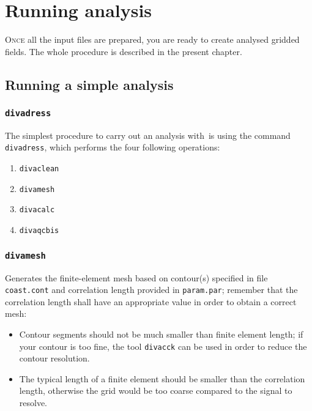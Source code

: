 \chapter{Running analysis \label{chap:running}}
\lettrine[lines=2, loversize=-0.1, lraise=0.1]{O}{nce} all the input files are prepared, you are ready to create analysed gridded fields. The whole procedure is described in the present chapter.
\minitoc

\section{Running a simple analysis}


\subsection{\texttt{divadress}}

The simplest procedure to carry out an analysis with \diva\,is using the command \texttt{divadress}, which performs the four following operations:

\begin{enumerate}
\item \texttt{divaclean}
\item \texttt{divamesh}
\item \texttt{divacalc}
\item \texttt{divaqcbis}
\end{enumerate}

\subsection{\texttt{divamesh}}

Generates the finite-element mesh based on contour(s) specified in file \texttt{coast.cont} and correlation length provided in \texttt{param.par}; remember that the correlation length shall have an appropriate value in order to obtain a correct mesh:
\begin{itemize}
\item Contour segments should not be much smaller than finite element length; if your contour is too fine, the tool \texttt{divacck} can be used in order to reduce the contour resolution.
\item The typical length of a finite element should be smaller than the correlation length, otherwise the grid would be too coarse compared to the signal to resolve.
\end{itemize}


